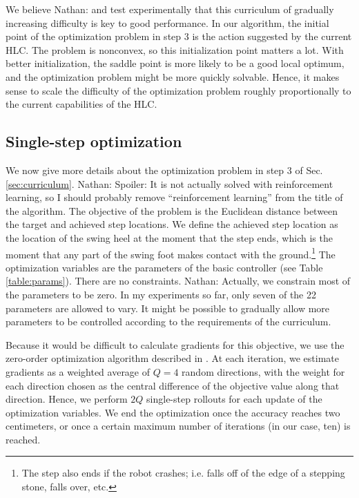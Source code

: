 \documentclass[a4paper]{article}
\newcommand{\nhatch}[1]{{\leavevmode\color{blue} Nathan: #1}}
\begin{document}
We believe \nhatch{and test experimentally} that this curriculum of gradually increasing difficulty is key to good performance.
In our algorithm, the initial point of the optimization problem in step 3 is the action suggested by the current HLC.
The problem is nonconvex, so this initialization point matters a lot.
With better initialization, the saddle point is more likely to be a good local optimum, and the optimization problem might be more quickly solvable.
Hence, it makes sense to scale the difficulty of the optimization problem roughly proportionally to the current capabilities of the HLC.

\subsection{Single-step optimization} \label{sec:optimization}

We now give more details about the optimization problem in step 3 of Sec. \ref{sec:curriculum}.
\nhatch{Spoiler: It is not actually solved with reinforcement learning, so I should probably remove ``reinforcement learning'' from the title of the algorithm.}
The objective of the problem is the Euclidean distance between the target and achieved step locations.
We define the achieved step location as the location of the swing heel at the moment that the step ends, which is the moment that any part of the swing foot makes contact with the ground.\footnote{The step also ends if the robot crashes; i.e. falls off of the edge of a stepping stone, falls over, etc.}
The optimization variables are the parameters of the basic controller (see Table \ref{table:params}).
There are no constraints.
\nhatch{Actually, we constrain most of the parameters to be zero. In my experiments so far, only seven of the 22 parameters are allowed to vary. It might be possible to gradually allow more parameters to be controlled according to the requirements of the curriculum.}

Because it would be difficult to calculate gradients for this objective, we use the zero-order optimization algorithm described in \cite{mania2018simple}.
At each iteration, we estimate gradients as a weighted average of $Q = 4$ random directions, with the weight for each direction chosen as the central difference of the objective value along that direction.
Hence, we perform $2Q$ single-step rollouts for each update of the optimization variables.
We end the optimization once the accuracy reaches two centimeters, or once a certain maximum number of iterations (in our case, ten) is reached.
\end{document}
